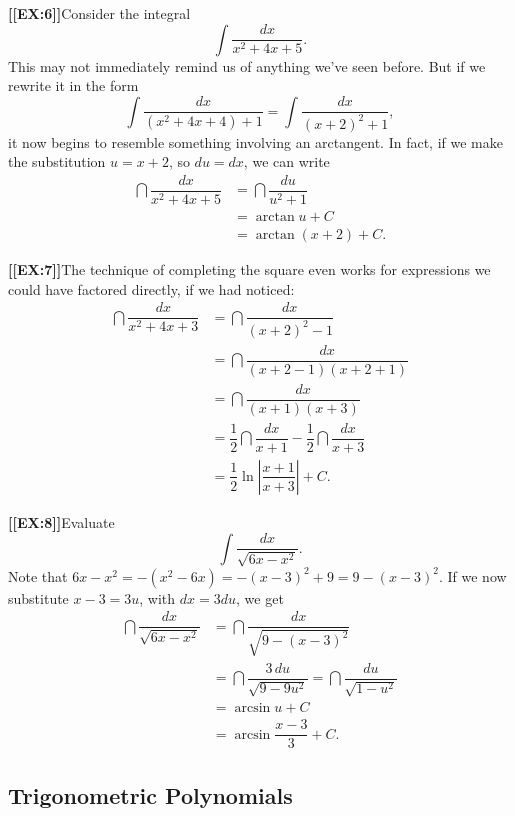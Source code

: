 {\bf [[EX:6]]}\quad Consider the integral
\[
\int \dfrac{dx}{x^2+4x+5}.
\]
This may not immediately remind us of anything we've seen before.  But
if we rewrite it in the form
\[
\int \dfrac{dx}{(x^2+4x+4)+1}=\int \dfrac{dx}{(x+2)^2+1},
\] 
it now begins to resemble something involving an arctangent.  In fact,
if we make the substitution $u=x+2$, so $du=dx$, we can write
\begin{align*}
\dint \dfrac{dx}{x^2+4x+5} 
        &= \dint \dfrac{du}{u^2+1} \\
	&= \arctan{u}+C \\
	&= \arctan(x+2) +C.
\end{align*}





{\bf [[EX:7]]}\quad The technique of completing the square even works
for expressions we could have factored directly, if we had noticed:
\begin{align*}
\dint \dfrac{dx}{x^2+4x+3} 
   &= \dint \dfrac{dx}{(x+2)^2-1} \\[3pt]
   &= \dint \dfrac{dx}{(x+2 -1)(x+2+1)} \\[3pt]
   &= \dint \dfrac{dx}{(x+1)(x+3)} \\[3pt]
   &= \dfrac{1}{2}\dint \dfrac{dx}{x+1}
           - \dfrac{1}{2}\dint \dfrac{dx}{x+3} \\[5pt]
   &= \dfrac{1}{2}\ln\left|\dfrac{x+1}{x+3}\right| +C.
\end{align*}






{\bf [[EX:8]]}\quad Evaluate
\[
\int \dfrac{dx}{\sqrt{6x-x^2}}.
\]
Note that $6x-x^2=-(x^2-6x)=-(x-3)^2+9=9-(x-3)^2$.  If we now substitute $x-3 =3u$, with $dx=3du$, we get
\begin{align*}
\dint \dfrac{dx}{\sqrt{6x-x^2}}
        &= \dint \dfrac{dx}{\sqrt{9-(x-3)^2}}\\
	&= \dint \dfrac{3 \, du}{\sqrt{9-9u^2}}
              = \dint \dfrac{du}{\sqrt{1-u^2}} \\
	&= \arcsin{u}+C \\
	&= \arcsin \dfrac{x-3}{3} +C.
\end{align*}

\subsection{Trigonometric Polynomials}
\label{subsec:trigonometric-polynomials}

